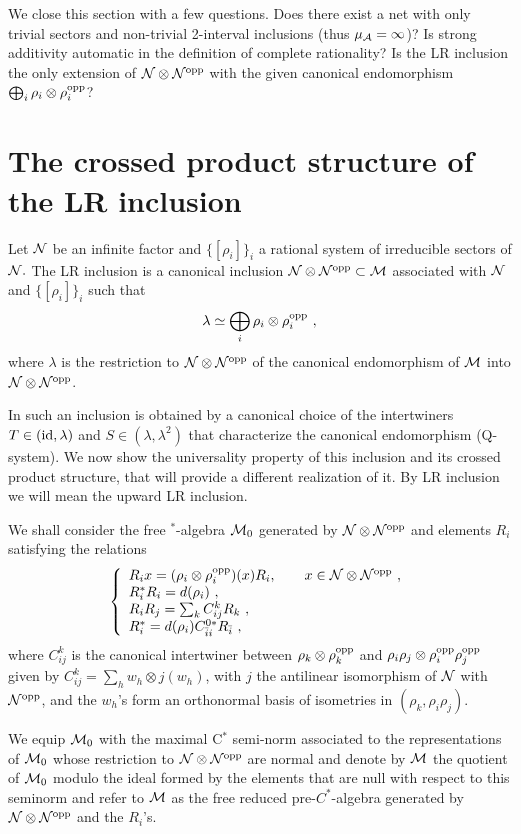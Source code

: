 \documentclass[12pt]{article}
\def\o{{\rm opp}}
\def\A{{\cal A}}
\def\N{{\cal N}}
\def\M{{\cal M}}
\begin{document}
We close this section with a few questions.  Does there exist a net 
with only trivial sectors and non-trivial 2-interval inclusions (thus 
$\mu_\A = \infty$)?  Is strong additivity automatic in the definition 
of complete rationality?  Is the LR inclusion the only extension of 
$\N\otimes\N^\o$ with the given canonical endomorphism $\bigoplus_i 
\rho_i\otimes\rho_i^\o$?  
\appendix
\section{The crossed product structure of the LR inclusion}\label{A1}
Let $\N$ be an infinite factor and $\{[\rho_i]\}_i$ a rational system 
of irreducible sectors of $\N.$ The LR inclusion \cite{LR} is a 
canonical inclusion $\N\otimes\N^\o\subset\M$ associated with $\N$ and 
$\{[\rho_i]\}_i$ such that
\[
\lambda \simeq \bigoplus_i \rho_i\otimes\rho_i^\o \ ,
\]
where $\lambda$ is the restriction to $\N\otimes \N^\o$ of the
canonical endomorphism of $\M$ into $\N\otimes \N^\o$.

In \cite{LR} such an inclusion is obtained by a canonical choice of 
the intertwiners $T\in({\rm id},\lambda)$ and 
$S\in(\lambda,\lambda^2)$ that characterize the canonical endomorphism 
\cite{L3} (Q-system).  We now show the universality property of this 
inclusion and its crossed product structure, that will provide a 
different realization of it. By LR inclusion we will mean the upward 
LR inclusion.

We shall consider the free $^*$-algebra $\M_0$ generated by $\N\otimes 
\N^\o$ and elements $R_i$ satisfying the relations
\begin{equation}\label{r}
\left\{
\begin{array}{l} R_i x=(\rho_i\otimes\rho^{\o}_i)(x)R_i,
        \qquad x\in \N\otimes \N^\o \  , \\
     R_i^*R_i =d(\rho_i)\  ,\\
 R_iR_j=\sum_k C^k_{ij}R_k \  , \\
    R_i^*=d(\rho_i)C^{0*}_{{\bar i}i} R_{\bar i} \ ,
      \end{array}   \right.
\end{equation}
where $C^k_{ij}$ is the canonical intertwiner between 
$\rho_k\otimes\rho^\o_k$ and $\rho_i\rho_j\otimes\rho^\o_i\rho^\o_j$ 
given by $C^k_{ij}=\sum_h w_h\otimes j(w_h)$, with $j$ the antilinear 
isomorphism of $\N$ with $\N^\o$, and the $w_h$'s form an orthonormal 
basis of isometries in $(\rho_k,\rho_i\rho_j)$.

We equip $\M_0$ with the maximal C$^*$ semi-norm associated to
the representations of $\M_0$ whose restriction to $\N\otimes \N^{\o}$
are normal and denote by $\M$ the quotient of $\M_0$
modulo the ideal formed by the elements that are null with respect to
this seminorm and refer to $\M$ as the free reduced
pre-$C^*$-algebra generated by $\N\otimes \N^\o$ and the $R_i$'s.
\end{document}
